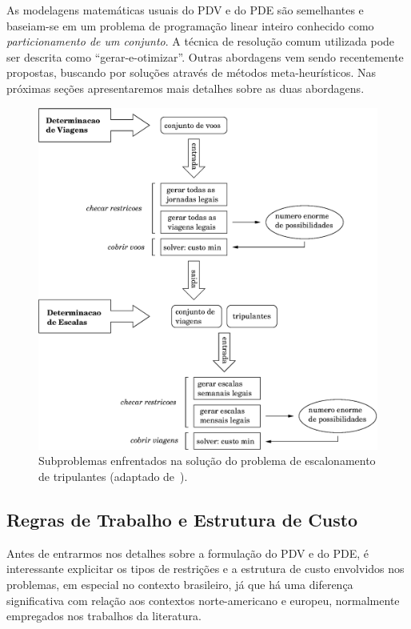 \documentclass[12pt,a4paper]{article}
\begin{document}
As modelagens matemáticas usuais do PDV e do PDE são semelhantes e baseiam-se em um problema de 
programação linear inteiro conhecido como \emph{particionamento de um conjunto}. A técnica 
de resolução comum utilizada pode ser descrita como ``gerar-e-otimizar''. Outras abordagens vem 
sendo recentemente propostas, buscando por soluções através de métodos meta-heurísticos. Nas 
próximas seções apresentaremos mais detalhes sobre as duas abordagens.

\begin{figure}[htbp]
	\begin{center}
		\includegraphics[scale=0.6]{fig/escalonamento.eps}
		\caption{Subproblemas enfrentados na solução do problema de escalonamento de tripulantes 
		(adaptado de~\cite{souai09}).}
		\label{fig:escalonamento}
	\end{center}
\end{figure}

\subsection{Regras de Trabalho e Estrutura de Custo}
\label{sec:regras_e_custos}

Antes de entrarmos nos detalhes sobre a formulação do PDV e do PDE, é interessante explicitar os 
tipos de restrições e a estrutura de custo envolvidos nos problemas, em especial no contexto 
brasileiro, já que há uma diferença significativa com relação aos contextos norte-americano e 
europeu, normalmente empregados nos trabalhos da literatura.
\end{document}
